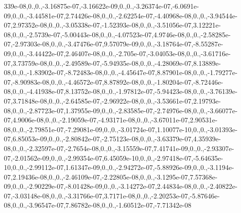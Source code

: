 \begin{DoxyCompactItemize}
339e-\/08,0.,0.,-\/3.\-16875e-\/07,-\/3.\-16622e-\/09,0.,0.,-\/3.\-26374e-\/07,-\/6.\-0691e-\/09,0.,0.,-\/3.\-44581e-\/07,2.\-74426e-\/08,0.,0.,-\/2.\-62254e-\/07,-\/4.\-40968e-\/08,0.,0.,-\/3.\-94544e-\/07,2.\-97352e-\/08,0.,0.,-\/3.\-05338e-\/07,-\/1.\-52393e-\/08,0.,0.,-\/3.\-51056e-\/07,3.\-12221e-\/08,0.,0.,-\/2.\-5739e-\/07,-\/5.\-00443e-\/08,0.,0.,-\/4.\-07523e-\/07,4.\-9746e-\/08,0.,0.,-\/2.\-58285e-\/07,-\/2.\-97303e-\/08,0.,0.,-\/3.\-47476e-\/07,9.\-57079e-\/09,0.,0.,-\/3.\-18764e-\/07,-\/8.\-55287e-\/09,0.,0.,-\/3.\-44422e-\/07,2.\-46407e-\/08,0.,0.,-\/2.\-705e-\/07,-\/3.\-04053e-\/08,0.,0.,-\/3.\-61716e-\/07,3.\-73759e-\/08,0.,0.,-\/2.\-49589e-\/07,-\/5.\-94935e-\/08,0.,0.,-\/4.\-28069e-\/07,8.\-13889e-\/08,0.,0.,-\/1.\-83902e-\/07,-\/8.\-72483e-\/08,0.,0.,-\/4.\-45647e-\/07,8.\-87901e-\/08,0.,0.,-\/1.\-79277e-\/07,-\/8.\-90983e-\/08,0.,0.,-\/4.\-46572e-\/07,8.\-87892e-\/08,0.,0.,-\/1.\-80204e-\/07,-\/8.\-72446e-\/08,0.,0.,-\/4.\-41938e-\/07,8.\-13752e-\/08,0.,0.,-\/1.\-97812e-\/07,-\/5.\-94423e-\/08,0.,0.,-\/3.\-76139e-\/07,3.\-71848e-\/08,0.,0.,-\/2.\-64585e-\/07,-\/2.\-96922e-\/08,0.,0.,-\/3.\-53661e-\/07,2.\-19793e-\/08,0.,0.,-\/2.\-87723e-\/07,1.\-37955e-\/09,0.,0.,-\/2.\-83585e-\/07,-\/2.\-74976e-\/08,0.,0.,-\/3.\-66077e-\/07,4.\-9006e-\/08,0.,0.,-\/2.\-19059e-\/07,-\/4.\-93171e-\/08,0.,0.,-\/3.\-67011e-\/07,2.\-90531e-\/08,0.,0.,-\/2.\-79851e-\/07,-\/7.\-29081e-\/09,0.,0.,-\/3.\-01724e-\/07,1.\-10077e-\/10,0.,0.,-\/3.\-01393e-\/07,6.\-85053e-\/09,0.,0.,-\/2.\-80842e-\/07,-\/2.\-75123e-\/08,0.,0.,-\/3.\-63379e-\/07,4.\-35939e-\/08,0.,0.,-\/2.\-32597e-\/07,-\/2.\-7654e-\/08,0.,0.,-\/3.\-15559e-\/07,7.\-41741e-\/09,0.,0.,-\/2.\-93307e-\/07,-\/2.\-01562e-\/09,0.,0.,-\/2.\-99354e-\/07,6.\-45059e-\/10,0.,0.,-\/2.\-97418e-\/07,-\/5.\-64635e-\/10,0.,0.,-\/2.\-99112e-\/07,1.\-61347e-\/09,0.,0.,-\/2.\-94272e-\/07,-\/5.\-88926e-\/09,0.,0.,-\/3.\-1194e-\/07,2.\-19436e-\/08,0.,0.,-\/2.\-46109e-\/07,-\/2.\-22805e-\/08,0.,0.,-\/3.\-1295e-\/07,7.\-57368e-\/09,0.,0.,-\/2.\-90229e-\/07,-\/8.\-01428e-\/09,0.,0.,-\/3.\-14272e-\/07,2.\-44834e-\/08,0.,0.,-\/2.\-40822e-\/07,-\/3.\-03148e-\/08,0.,0.,-\/3.\-31766e-\/07,3.\-7171e-\/08,0.,0.,-\/2.\-20253e-\/07,-\/5.\-87646e-\/08,0.,0.,-\/3.\-96547e-\/07,7.\-86782e-\/08,0.,0.,-\/1.\-60512e-\/07,-\/7.\-71342e-\/08
\end{DoxyCompactItemize}

